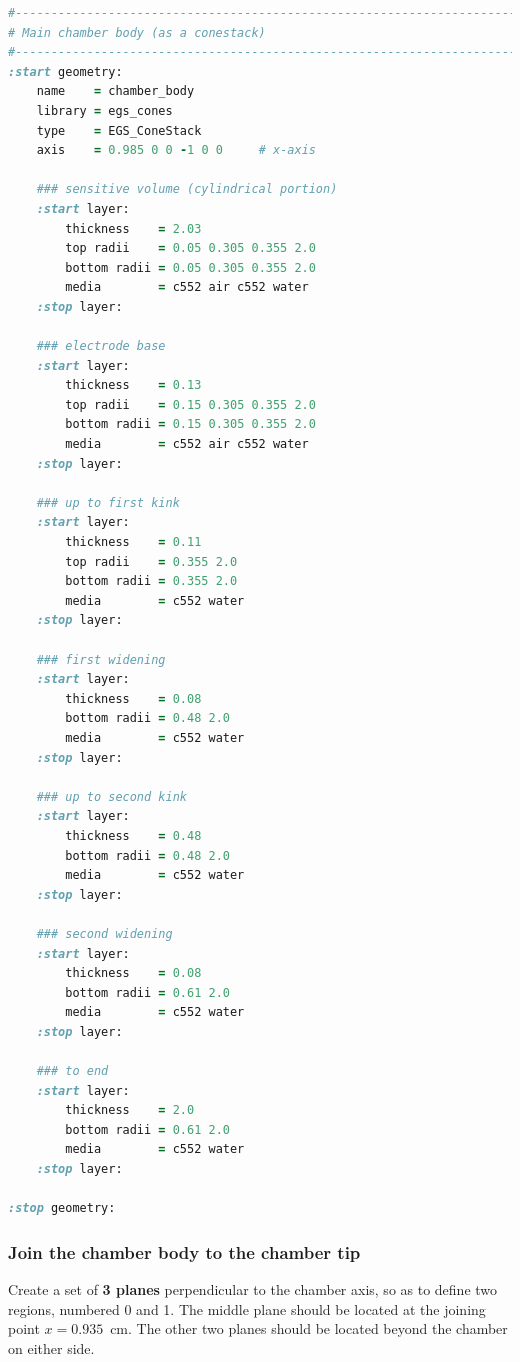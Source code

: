 \documentclass[12pt,twoside]{article}
\begin{document}
{\small
\begin{lstlisting}[language=ruby,backgroundcolor=\color{white}]
#-------------------------------------------------------------------------
# Main chamber body (as a conestack)
#-------------------------------------------------------------------------
:start geometry:
    name    = chamber_body
    library = egs_cones
    type    = EGS_ConeStack
    axis    = 0.985 0 0 -1 0 0     # x-axis

    ### sensitive volume (cylindrical portion)
    :start layer:
        thickness    = 2.03
        top radii    = 0.05 0.305 0.355 2.0
        bottom radii = 0.05 0.305 0.355 2.0
        media        = c552 air c552 water
    :stop layer:

    ### electrode base
    :start layer:
        thickness    = 0.13
        top radii    = 0.15 0.305 0.355 2.0
        bottom radii = 0.15 0.305 0.355 2.0
        media        = c552 air c552 water
    :stop layer:

    ### up to first kink
    :start layer:
        thickness    = 0.11
        top radii    = 0.355 2.0
        bottom radii = 0.355 2.0
        media        = c552 water
    :stop layer:

    ### first widening
    :start layer:
        thickness    = 0.08
        bottom radii = 0.48 2.0
        media        = c552 water
    :stop layer:

    ### up to second kink
    :start layer:
        thickness    = 0.48
        bottom radii = 0.48 2.0
        media        = c552 water
    :stop layer:

    ### second widening
    :start layer:
        thickness    = 0.08
        bottom radii = 0.61 2.0
        media        = c552 water
    :stop layer:

    ### to end
    :start layer:
        thickness    = 2.0
        bottom radii = 0.61 2.0
        media        = c552 water
    :stop layer:

:stop geometry:
\end{lstlisting}
}

\subsubsection{Join the chamber body to the chamber tip}

Create a set of \textbf{3 planes} perpendicular to the chamber axis, so as to
define two regions, numbered 0 and 1. The middle plane should be located at the
joining point $x=0.935$~cm. The other two planes should be located beyond the
chamber on either side.
\end{document}
